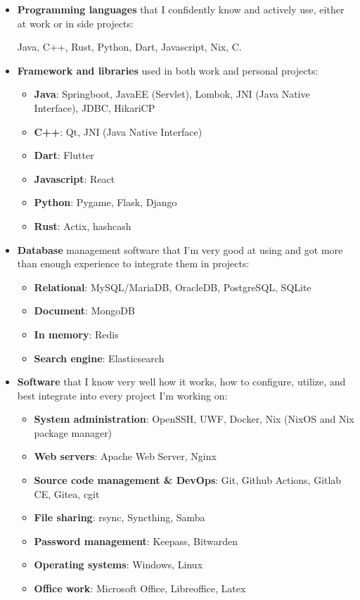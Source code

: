 \documentclass{paper}
\begin{document}
\begin{itemize}
    \item \textbf{Programming languages} that I confidently know and actively use, either at work or in side projects:

    Java, C++, Rust, Python, Dart, Javascript, Nix, C.

    \item \textbf{Framework and libraries} used in both work and personal projects:

    \begin{itemize}
        \item \textbf{Java}: Springboot, JavaEE (Servlet), Lombok, JNI (Java Native Interface), JDBC, HikariCP
        \item \textbf{C++}: Qt, JNI (Java Native Interface)
        \item \textbf{Dart}: Flutter
        \item \textbf{Javascript}: React
        \item \textbf{Python}: Pygame, Flask, Django
        \item \textbf{Rust}: Actix, hashcash
    \end{itemize}

    \item \textbf{Database} management software that I'm very good at using and got more than enough experience to integrate them in projects:

    \begin{itemize}
        \item \textbf{Relational}: MySQL/MariaDB, OracleDB, PostgreSQL, SQLite
        \item \textbf{Document}: MongoDB
        \item \textbf{In memory}: Redis
        \item \textbf{Search engine}: Elasticsearch
    \end{itemize}

    \item \textbf{Software} that I know very well how it works, how to configure, utilize, and best integrate into every project I'm working on:

    \begin{itemize}
        \item \textbf{System administration}: OpenSSH, UWF, Docker, Nix (NixOS and Nix package manager)
        \item \textbf{Web servers}: Apache Web Server, Nginx
        \item \textbf{Source code management \& DevOps}: Git, Github Actions, Gitlab CE, Gitea, cgit
        \item \textbf{File sharing}: rsync, Syncthing, Samba
        \item \textbf{Password management}: Keepass, Bitwarden
        \item \textbf{Operating systems}: Windows, Linux
        \item \textbf{Office work}: Microsoft Office, Libreoffice, Latex
    \end{itemize}
\end{itemize}
\end{document}
